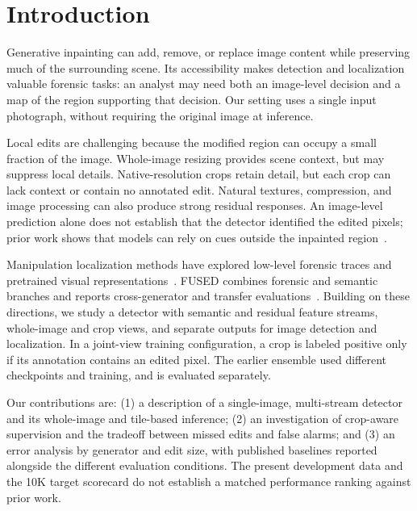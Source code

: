 \section{Introduction}
\label{sec:intro}
Generative inpainting can add, remove, or replace image content while preserving much of the surrounding scene. Its accessibility makes detection and localization valuable forensic tasks: an analyst may need both an image-level decision and a map of the region supporting that decision. Our setting uses a single input photograph, without requiring the original image at inference.

Local edits are challenging because the modified region can occupy a small fraction of the image. Whole-image resizing provides scene context, but may suppress local details. Native-resolution crops retain detail, but each crop can lack context or contain no annotated edit. Natural textures, compression, and image processing can also produce strong residual responses. An image-level prediction alone does not establish that the detector identified the edited pixels; prior work shows that models can rely on cues outside the inpainted region~\cite{inpx}.

Manipulation localization methods have explored low-level forensic traces and pretrained visual representations~\cite{trufor,declip,opensdi}. FUSED combines forensic and semantic branches and reports cross-generator and transfer evaluations~\cite{fused}. Building on these directions, we study a detector with semantic and residual feature streams, whole-image and crop views, and separate outputs for image detection and localization. In a joint-view training configuration, a crop is labeled positive only if its annotation contains an edited pixel. The earlier ensemble used different checkpoints and training, and is evaluated separately.

Our contributions are: (1) a description of a single-image, multi-stream detector and its whole-image and tile-based inference; (2) an investigation of crop-aware supervision and the tradeoff between missed edits and false alarms; and (3) an error analysis by generator and edit size, with published baselines reported alongside the different evaluation conditions. The present development data and the 10K target scorecard do not establish a matched performance ranking against prior work.
